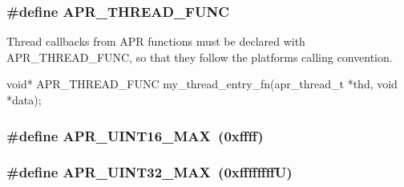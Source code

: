 \subsubsection[{\texorpdfstring{A\+P\+R\+\_\+\+T\+H\+R\+E\+A\+D\+\_\+\+F\+U\+NC}{APR_THREAD_FUNC}}]{\setlength{\rightskip}{0pt plus 5cm}\#define A\+P\+R\+\_\+\+T\+H\+R\+E\+A\+D\+\_\+\+F\+U\+NC}\hypertarget{group__apr__platform_gade8f829f9bd98fd4386894acf72edd7c}{}\label{group__apr__platform_gade8f829f9bd98fd4386894acf72edd7c}
Thread callbacks from A\+PR functions must be declared with A\+P\+R\+\_\+\+T\+H\+R\+E\+A\+D\+\_\+\+F\+U\+NC, so that they follow the platform\textquotesingle{}s calling convention. 
\begin{DoxyPre}\end{DoxyPre}



\begin{DoxyPre}void* APR\_THREAD\_FUNC my\_thread\_entry\_fn(apr\_thread\_t *thd, void *data);\end{DoxyPre}



\begin{DoxyPre}\end{DoxyPre}
\subsubsection[{\texorpdfstring{A\+P\+R\+\_\+\+U\+I\+N\+T16\+\_\+\+M\+AX}{APR_UINT16_MAX}}]{\setlength{\rightskip}{0pt plus 5cm}\#define A\+P\+R\+\_\+\+U\+I\+N\+T16\+\_\+\+M\+AX~(0xffff)}\hypertarget{group__apr__platform_ga2b7a0eb7506ac0bfc4d711929f9a3a48}{}\label{group__apr__platform_ga2b7a0eb7506ac0bfc4d711929f9a3a48}
\subsubsection[{\texorpdfstring{A\+P\+R\+\_\+\+U\+I\+N\+T32\+\_\+\+M\+AX}{APR_UINT32_MAX}}]{\setlength{\rightskip}{0pt plus 5cm}\#define A\+P\+R\+\_\+\+U\+I\+N\+T32\+\_\+\+M\+AX~(0xffffffff\+U)}\hypertarget{group__apr__platform_ga239c26656c361f627f7db619997abaac}{}\label{group__apr__platform_ga239c26656c361f627f7db619997abaac}
